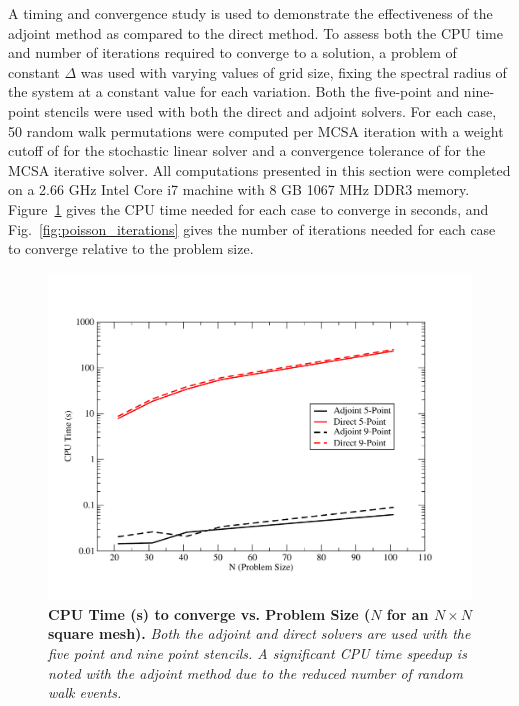 A timing and convergence study is used to demonstrate the
effectiveness of the adjoint method as compared to the direct
method. To assess both the CPU time and number of iterations required
to converge to a solution, a problem of constant $\Delta$ was used
with varying values of grid size, fixing the spectral radius of the
system at a constant value for each variation. Both the five-point and
nine-point stencils were used with both the direct and adjoint
solvers. For each case, 50 random walk permutations were computed per
MCSA iteration with a weight cutoff of  for the stochastic
linear solver and a convergence tolerance of  for the MCSA
iterative solver. All computations presented in this section were
completed on a 2.66 GHz Intel Core i7 machine with 8 GB 1067 MHz DDR3
memory. Figure~\ref{fig:poisson_cpu_time} gives the CPU time needed
for each case to converge in seconds, and
Fig.~\ref{fig:poisson_iterations} gives the number of iterations
needed for each case to converge relative to the problem size.
\begin{figure}[h!]
  \centering
  \includegraphics[width=5in,clip]{chapters/research_proposal/Adjoint_Direct_CPU_Time.pdf}
  \caption{\textbf{CPU Time (s) to converge vs. Problem Size ($N$ for
      an $N \times N$ square mesh).} \textit{Both the adjoint and
      direct solvers are used with the five point and nine point
      stencils. A significant CPU time speedup is noted with the
      adjoint method due to the reduced number of random walk
      events.}}
  \label{fig:poisson_cpu_time}
\end{figure}

